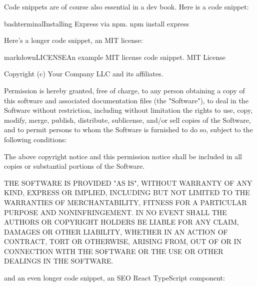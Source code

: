 \documentclass[a4paper,headinclude=on,footinclude=on,12pt,oneside]{scrbook}
\begin{document}
Code snippets are of course also essential in a dev book. Here is a code snippet:

\begin{codeInput}{bash}{terminal}{Installing Express via npm.}
npm install express
\end{codeInput}

Here's a longer code snippet, an MIT license:

\begin{codeInput}{markdown}{LICENSE}{An example MIT license code snippet.}
MIT License

Copyright (c) Your Company LLC and its affiliates.

Permission is hereby granted, free of charge, to any person obtaining a copy
of this software and associated documentation files (the "Software"), to deal
in the Software without restriction, including without limitation the rights
to use, copy, modify, merge, publish, distribute, sublicense, and/or sell
copies of the Software, and to permit persons to whom the Software is
furnished to do so, subject to the following conditions:

The above copyright notice and this permission notice shall be included in all
copies or substantial portions of the Software.

THE SOFTWARE IS PROVIDED "AS IS", WITHOUT WARRANTY OF ANY KIND, EXPRESS OR
IMPLIED, INCLUDING BUT NOT LIMITED TO THE WARRANTIES OF MERCHANTABILITY,
FITNESS FOR A PARTICULAR PURPOSE AND NONINFRINGEMENT. IN NO EVENT SHALL THE
AUTHORS OR COPYRIGHT HOLDERS BE LIABLE FOR ANY CLAIM, DAMAGES OR OTHER
LIABILITY, WHETHER IN AN ACTION OF CONTRACT, TORT OR OTHERWISE, ARISING FROM,
OUT OF OR IN CONNECTION WITH THE SOFTWARE OR THE USE OR OTHER DEALINGS IN THE
SOFTWARE.
\end{codeInput}

and an even longer code snippet, an SEO React TypeScript component:
\end{document}
